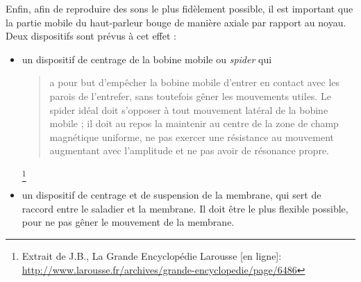 Enfin, afin de reproduire des sons le plus fidèlement possible, il est important que la partie mobile du haut-parleur bouge de manière axiale par rapport au noyau.
Deux dispositifs sont prévus à cet effet \cite[p.~6486]{Larousse} : 
\begin{itemize}
\item un dispositif de centrage de la bobine mobile ou \textit{spider} qui \begin{quote} a pour but d’empêcher la bobine mobile d’entrer en contact avec les parois de l’entrefer, sans toutefois gêner les mouvements utiles. Le spider idéal doit s’opposer à tout mouvement latéral de la bobine mobile ; il doit au repos la maintenir au centre de la zone de champ magnétique uniforme, ne pas exercer une résistance au mouvement augmentant avec l’amplitude et ne pas avoir de résonance propre.\end{quote} \footnote{Extrait de J.B., \og La Grande Encyclopédie Larousse [en ligne]\fg : \url{http://www.larousse.fr/archives/grande-encyclopedie/page/6486}}
\item un dispositif de centrage et de suspension de la membrane, qui sert de raccord entre le saladier et la membrane. Il doit être le plus flexible possible, pour ne pas gêner le mouvement de la membrane.
\end{itemize}







